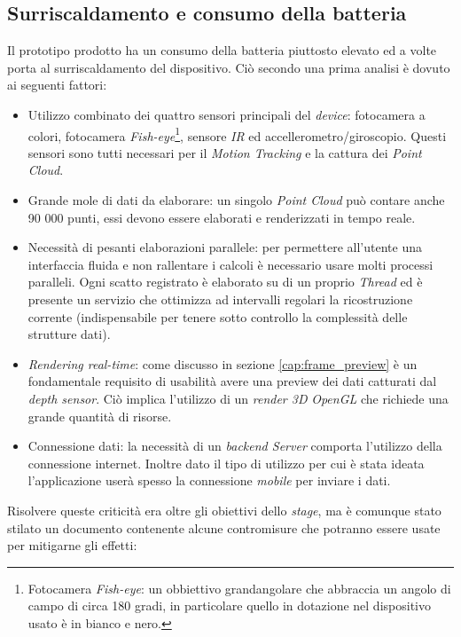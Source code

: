 \subsection{Surriscaldamento e consumo della batteria}
Il prototipo prodotto ha un consumo della batteria piuttosto elevato ed a volte porta al surriscaldamento del dispositivo.
Ciò secondo una prima analisi è dovuto ai seguenti fattori:
\begin{itemize}
	\item Utilizzo combinato dei quattro sensori principali del \emph{device}: fotocamera a colori, fotocamera \emph{Fish-eye}\footnote{Fotocamera \emph{Fish-eye}: un obbiettivo grandangolare che abbraccia un angolo di campo di circa 180 gradi, in particolare quello in dotazione nel dispositivo usato è in bianco e nero.}, sensore \emph{IR} ed accellerometro/giroscopio. Questi sensori sono tutti necessari per il \emph{Motion Tracking} e la cattura dei \emph{Point Cloud}.
	\item Grande mole di dati da elaborare: un singolo \emph{Point Cloud} può contare anche 90 000 punti, essi devono essere elaborati e renderizzati in tempo reale.	
	\item Necessità di pesanti elaborazioni parallele: per permettere all'utente una interfaccia fluida e non rallentare i calcoli è necessario usare molti processi paralleli. Ogni scatto registrato è elaborato su di un proprio \emph{Thread} ed è presente un servizio che ottimizza ad intervalli regolari la ricostruzione corrente (indispensabile per tenere sotto controllo la complessità delle strutture dati).
	\item \emph{Rendering real-time}: come discusso in sezione \ref{cap:frame_preview} è un fondamentale requisito di usabilità avere una preview dei dati catturati dal \emph{depth sensor}. Ciò implica l'utilizzo di un \emph{render 3D} \emph{OpenGL} che richiede una grande quantità di risorse.
	\item Connessione dati: la necessità di un \emph{backend Server} comporta l'utilizzo della connessione internet. Inoltre dato il tipo di utilizzo per cui è stata ideata l'applicazione userà spesso la connessione \emph{mobile} per inviare i dati.
\end{itemize}
Risolvere queste criticità era oltre gli obiettivi dello \emph{stage}, ma è comunque stato stilato un documento contenente alcune contromisure che potranno essere usate per mitigarne gli effetti:
